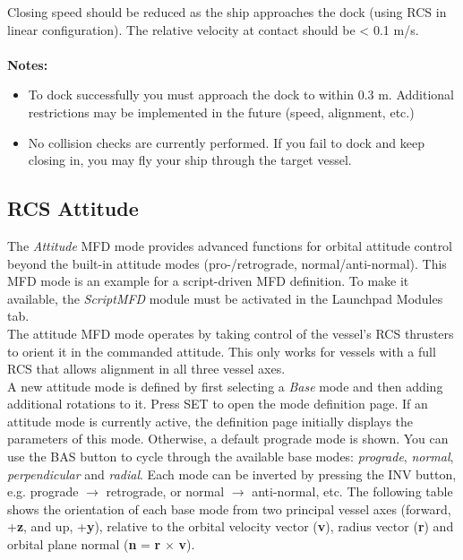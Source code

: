 \documentclass[Orbiter User Manual.tex]{subfiles}
\begin{document}
\noindent
Closing speed should be reduced as the ship approaches the dock (using RCS in linear configuration). The relative velocity at contact should be < 0.1 m/s.\\
\\
\textbf{Notes:}

\begin{itemize}
\item To dock successfully you must approach the dock to within 0.3 m. Additional restrictions may be implemented in the future (speed, alignment, etc.)
\item No collision checks are currently performed. If you fail to dock and keep closing in, you may fly your ship through the target vessel.
\end{itemize}


\subsection{RCS Attitude}
The \textit{Attitude} MFD mode provides advanced functions for orbital attitude control beyond the built-in attitude modes (pro-/retrograde, normal/anti-normal). This MFD mode is an example for a script-driven MFD definition. To make it available, the \textit{ScriptMFD} module must be activated in the Launchpad Modules tab.\\
The attitude MFD mode operates by taking control of the vessel's RCS thrusters to orient it in the commanded attitude. This only works for vessels with a full RCS that allows alignment in all three vessel axes.\\
A new attitude mode is defined by first selecting a \textit{Base} mode and then adding additional rotations to it. Press SET to open the mode definition page. If an attitude mode is currently active, the definition page initially displays the parameters of this mode. Otherwise, a default prograde mode is shown. You can use the BAS button to cycle through the available base modes: \textit{prograde}, \textit{normal}, \textit{perpendicular} and \textit{radial}. Each mode can be inverted by pressing the INV button, e.g. prograde $\rightarrow$ retrograde, or normal $\rightarrow$ anti-normal, etc. The following table shows the orientation of each base mode from two principal vessel axes (forward, +\textbf{z}, and up, +\textbf{y}), relative to the orbital velocity vector (\textbf{v}), radius vector (\textbf{r}) and orbital plane normal (\textbf{n} = \textbf{r} $\times$ \textbf{v}).
\end{document}
